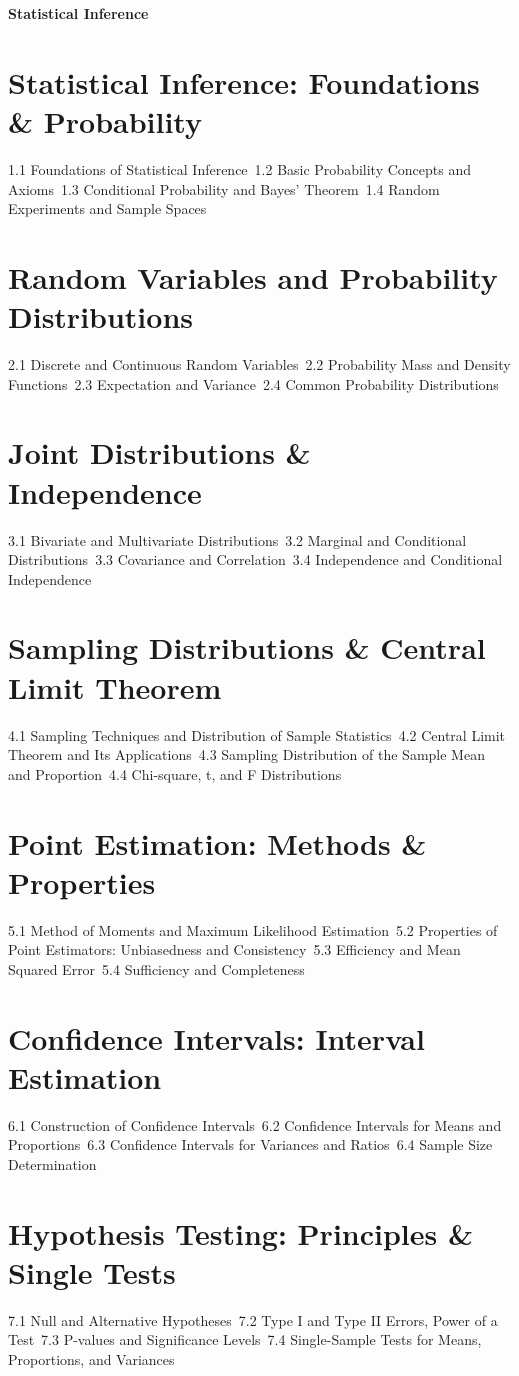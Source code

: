 {\LARGE \bf{Statistical Inference}}
\section{Statistical Inference: Foundations \& Probability}
1.1 Foundations of Statistical Inference\
1.2 Basic Probability Concepts and Axioms\
1.3 Conditional Probability and Bayes' Theorem\
1.4 Random Experiments and Sample Spaces\
\section{Random Variables and Probability Distributions}
2.1 Discrete and Continuous Random Variables\
2.2 Probability Mass and Density Functions\
2.3 Expectation and Variance\
2.4 Common Probability Distributions\
\section{Joint Distributions \& Independence}
3.1 Bivariate and Multivariate Distributions\
3.2 Marginal and Conditional Distributions\
3.3 Covariance and Correlation\
3.4 Independence and Conditional Independence\
\section{Sampling Distributions \& Central Limit Theorem}
4.1 Sampling Techniques and Distribution of Sample Statistics\
4.2 Central Limit Theorem and Its Applications\
4.3 Sampling Distribution of the Sample Mean and Proportion\
4.4 Chi-square, t, and F Distributions\
\section{Point Estimation: Methods \& Properties}
5.1 Method of Moments and Maximum Likelihood Estimation\
5.2 Properties of Point Estimators: Unbiasedness and Consistency\
5.3 Efficiency and Mean Squared Error\
5.4 Sufficiency and Completeness\
\section{Confidence Intervals: Interval Estimation}
6.1 Construction of Confidence Intervals\
6.2 Confidence Intervals for Means and Proportions\
6.3 Confidence Intervals for Variances and Ratios\
6.4 Sample Size Determination\
\section{Hypothesis Testing: Principles \& Single Tests}
7.1 Null and Alternative Hypotheses\
7.2 Type I and Type II Errors, Power of a Test\
7.3 P-values and Significance Levels\
7.4 Single-Sample Tests for Means, Proportions, and Variances\
